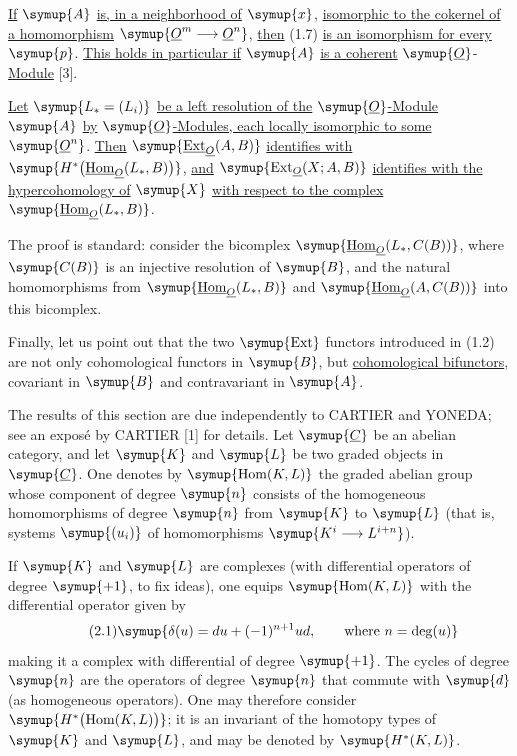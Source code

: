  \uline{If} $\symup{A}$ \uline{is, in a neighborhood of} $\symup{x}$, \uline{isomorphic to the
cokernel of a homomorphism} $\symup{\Osh^{m}\longrightarrow\Osh^{n}}$, \uline{then} (1.7) \uline{is an isomorphism for every} $\symup{p}$. \uline{This holds in particular if}
$\symup{A}$ \uline{is a coherent} $\symup{\Osh}$-\uline{Module} [3].

 \uline{Let} $\symup{L_{*}=(L_i)}$ \uline{be a left resolution of the}
$\symup{\Osh}$\uline{-Module} $\symup{A}$ \uline{by} $\symup{\Osh}$\uline{-Modules, each locally isomorphic to some} $\symup{\Osh^{n}}$.
\uline{Then} $\symup{\Extsh_{\Osh}(A,B)}$ \uline{identifies with}
$\symup{H^{*}\bigl(\Homsh_{\Osh}(L_{*},B)\bigr)}$, \uline{and}
$\symup{\operatorname{Ext}_{\Osh}(X;A,B)}$ \uline{identifies with the hypercohomology of}
$\symup{X}$ \uline{with respect to the complex} $\symup{\Homsh_{\Osh}(L_{*},B)}$.

The proof is standard: consider the bicomplex $\symup{\Homsh_{\Osh}(L_{*},C(B))}$,
where $\symup{C(B)}$ is an injective resolution of $\symup{B}$, and the natural homomorphisms
from $\symup{\Homsh_{\Osh}(L_{*},B)}$ and $\symup{\Homsh_{\Osh}(A,C(B))}$ into this bicomplex.

Finally, let us point out that the two $\symup{\operatorname{Ext}}$ functors introduced
in (1.2) are not only cohomological functors in $\symup{B}$, but \uline{cohomological bifunctors}, covariant in $\symup{B}$ and contravariant in $\symup{A}$.


The results of this section are due independently to CARTIER and YONEDA; see an
exposé by CARTIER [1] for details. Let $\symup{\underline{C}}$ be an abelian category, and let
$\symup{K}$ and $\symup{L}$ be two graded objects in $\symup{\underline{C}}$. One denotes by
$\symup{\operatorname{Hom}(K,L)}$ the graded abelian group whose component of degree
$\symup{n}$ consists of the homogeneous homomorphisms of degree $\symup{n}$ from $\symup{K}$ to $\symup{L}$
(that is, systems $\symup{(u_i)}$ of homomorphisms
$\symup{K^{i}\longrightarrow L^{i+n}}$).

If $\symup{K}$ and $\symup{L}$ are complexes (with differential operators of degree $\symup{+1}$, to
fix ideas), one equips $\symup{\operatorname{Hom}(K,L)}$ with the differential operator
given by
\begin{equation}\tag{2.1}
  \symup{\delta(u)=du+(-1)^{n+1}ud,\qquad\text{where }n=\deg(u)}
\end{equation}
making it a complex with differential of degree $\symup{+1}$. The cycles of degree $\symup{n}$
are the operators of degree $\symup{n}$ that commute with $\symup{d}$ (as homogeneous
operators). One may therefore consider
$\symup{H^{*}\bigl(\operatorname{Hom}(K,L)\bigr)}$; it is an invariant of the homotopy
types of $\symup{K}$ and $\symup{L}$, and may be denoted by $\symup{H^{*}(K,L)}$.

